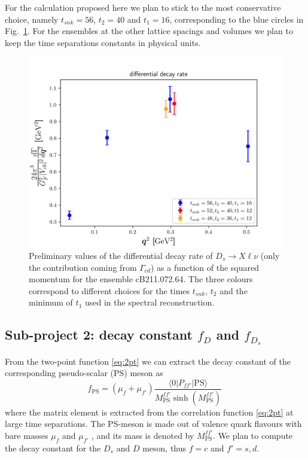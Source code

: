 For the calculation proposed here we plan to stick to the most
conservative choice, namely $t_{snk}=56$, $t_2=40$ and $t_1=16$,
corresponding to the blue circles in Fig.~\ref{fig:Gamma_B64}.
For the ensembles at the other lattice spacings and volumes we plan to keep the
time separations constants in physical units. 


\begin{figure}
  \centering
  \includegraphics[scale=0.7]{plots/phys_decay_rate_comp3.png}
  \caption{Preliminary values of the differential decay rate of
    $D_s\to X\ell\nu$ (only the contribution coming from $\Gamma_{cd}$) as a function of the squared momentum for the
    ensemble cB211.072.64. The three colours correspond to different
    choices for the times $t_{snk}$, $t_2$ and the minimum of $t_1$
    used in the spectral reconstruction.}
  \label{fig:Gamma_B64}
\end{figure}

\subsection{Sub-project 2: decay constant $f_D$ and $f_{D_s}$}

From the two-point function \eqref{eq:2pt} we can extract the decay
constant of the corresponding pseudo-scalar (PS) meson as 
\begin{equation}
  f_\mathrm{PS}=(\mu_f+\mu_{f'})\frac{\langle 0| P_{ff'}|
    \mathrm{PS}\rangle}{M_\mathrm{PS}^{ff'}\sinh(M_\mathrm{PS}^{ff'})}\, 
\end{equation}
where the matrix element is extracted from the correlation function
\eqref{eq:2pt} at large time separations. The PS-meson is made out of
valence quark flavours with bare masses $\mu_f$ and $\mu_{f'}$ , and
its mass is denoted by $M_\mathrm{PS}^{ff'}$. We plan to compute the
decay constant for the $D_s$ and $D$ meson, thus $f=c$ and $f'=s,d$. 

\endinput
